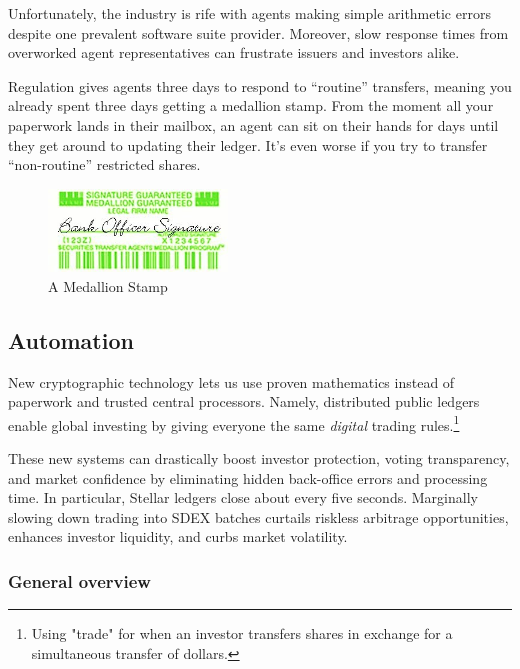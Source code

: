\documentclass[11pt, english]{article}
\begin{document}
\begin{multicols}{2}
Unfortunately, the industry is rife with agents making simple arithmetic errors despite one prevalent software suite provider. Moreover, slow response times from overworked agent representatives can frustrate issuers and investors alike.

Regulation gives agents three days to respond to ``routine'' transfers, meaning you already spent three days getting a medallion stamp. From the moment all your paperwork lands in their mailbox, an agent can sit on their hands for days until they get around to updating their ledger. It's even worse if you try to transfer ``non-routine'' restricted shares. 

\begin{figure}[H]
    \centering
    \includegraphics[width=180]{medallion.jpg}
    \caption{A Medallion Stamp}
    \label{fig:decentralized}
\end{figure}


\subsection{Automation}

New cryptographic technology lets us use proven mathematics instead of paperwork and trusted central processors. Namely, distributed public ledgers enable global investing by giving everyone the same \textit{digital} trading rules.\footnote{Using "trade" for when an investor transfers shares in exchange for a simultaneous transfer of dollars.}

These new systems can drastically boost investor protection, voting transparency, and market confidence by eliminating hidden back-office errors and processing time. In particular, Stellar ledgers close about every five seconds. Marginally slowing down trading into SDEX batches curtails riskless arbitrage opportunities, enhances investor liquidity, and curbs market volatility. \cite{Veryzhenko_2017,Budish_2015,Chakrabarty_2015}

\subsubsection{General overview}


\end{multicols}
\end{document}
